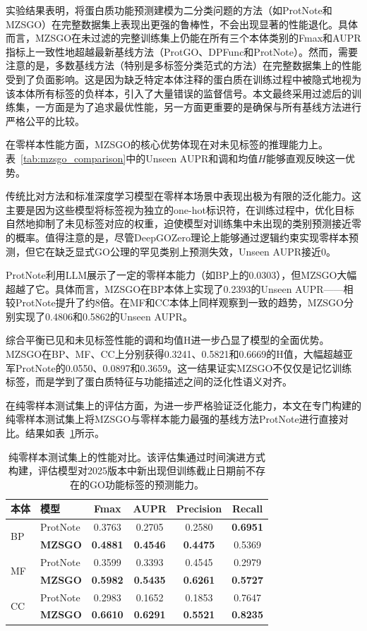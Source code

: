 实验结果表明，将蛋白质功能预测建模为二分类问题的方法（如ProtNote和MZSGO）在完整数据集上表现出更强的鲁棒性，不会出现显著的性能退化。具体而言，MZSGO在未过滤的完整训练集上仍能在所有三个本体类别的Fmax和AUPR指标上一致性地超越最新基线方法（ProtGO、DPFunc和ProtNote）。然而，需要注意的是，多数基线方法（特别是多标签分类范式的方法）在完整数据集上的性能受到了负面影响。这是因为缺乏特定本体注释的蛋白质在训练过程中被隐式地视为该本体所有标签的负样本，引入了大量错误的监督信号。本文最终采用过滤后的训练集，一方面是为了追求最优性能，另一方面更重要的是确保与所有基线方法进行严格公平的比较。

在零样本性能方面，MZSGO的核心优势体现在对未见标签的推理能力上。表~\ref{tab:mzsgo_comparison}中的Unseen AUPR和调和均值$H$能够直观反映这一优势。

传统比对方法和标准深度学习模型在零样本场景中表现出极为有限的泛化能力。这主要是因为这些模型将标签视为独立的one-hot标识符，在训练过程中，优化目标自然地抑制了未见标签对应的权重，迫使模型对训练集中未出现的类别预测接近零的概率。值得注意的是，尽管DeepGOZero理论上能够通过逻辑约束实现零样本预测，但它在缺乏显式GO公理的罕见类别上预测失效，Unseen AUPR接近0。

ProtNote利用LLM展示了一定的零样本能力（如BP上的0.0303），但MZSGO大幅超越了它。具体而言，MZSGO在BP本体上实现了0.2393的Unseen AUPR——相较ProtNote提升了约8倍。在MF和CC本体上同样观察到一致的趋势，MZSGO分别实现了0.4806和0.5862的Unseen AUPR。

综合平衡已见和未见标签性能的调和均值H进一步凸显了模型的全面优势。MZSGO在BP、MF、CC上分别获得0.3241、0.5821和0.6669的H值，大幅超越亚军ProtNote的0.0550、0.0897和0.3659。这一结果证实MZSGO不仅仅是记忆训练标签，而是学到了蛋白质特征与功能描述之间的泛化性语义对齐。

在纯零样本测试集上的评估方面，为进一步严格验证泛化能力，本文在专门构建的纯零样本测试集上将MZSGO与零样本能力最强的基线方法ProtNote进行直接对比。结果如表~\ref{tab:mzsgo_zeroshot}所示。

\begin{table}[htbp]
\centering
\caption{纯零样本测试集上的性能对比。该评估集通过时间演进方式构建，评估模型对2025版本中新出现但训练截止日期前不存在的GO功能标签的预测能力。}
\label{tab:mzsgo_zeroshot}
\small
\begin{tabular}{llcccc}
\toprule
\textbf{本体} & \textbf{模型} & \textbf{Fmax} & \textbf{AUPR} & \textbf{Precision} & \textbf{Recall} \\
\midrule
\multirow{2}{*}{BP} 
 & ProtNote & 0.3763 & 0.2705 & 0.2580 & \textbf{0.6951} \\
 & \textbf{MZSGO} & \textbf{0.4881} & \textbf{0.4546} & \textbf{0.4475} & 0.5369 \\
\midrule
\multirow{2}{*}{MF} 
 & ProtNote & 0.3599 & 0.3393 & 0.4545 & 0.2979 \\
 & \textbf{MZSGO} & \textbf{0.5982} & \textbf{0.5435} & \textbf{0.6261} & \textbf{0.5727} \\
\midrule
\multirow{2}{*}{CC} 
 & ProtNote & 0.2983 & 0.1652 & 0.1853 & 0.7647 \\
 & \textbf{MZSGO} & \textbf{0.6610} & \textbf{0.6291} & \textbf{0.5521} & \textbf{0.8235} \\
\bottomrule
\end{tabular}
\end{table}

